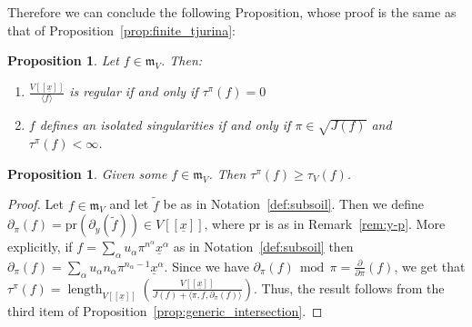 \documentclass{article}
\newtheorem{proposition}[theorem]{Proposition}
\DeclareMathOperator{\length}{length}
\newcommand{\maxV}{\mathfrak{m}_V}
\newcommand{\pder}{\frac{\partial}{\partial \pi}}
\numberwithin{theorem}{section}
\renewcommand{\mod}{\,\operatorname{mod}\,}
\begin{document}
Therefore we can conclude the following Proposition, whose proof is the same as that of Proposition~\ref{prop:finite_tjurina}:

\begin{proposition}\label{prop:ramified_iso_sing}
    Let $f \in \maxV$. Then:
    \begin{enumerate}
        \item $\frac{V[[\underline{x}]]}{ \langle f \rangle}$ is regular if and only if $\tau^\pi(f)=0$
        \item $f$ defines an isolated singularities if and only if $\pi \in \sqrt{J\left(f\right)}$ and  $\tau^\pi\left(f\right) < \infty$.
    \end{enumerate}
\end{proposition}


\begin{proposition}\label{prop:inequality_tau_pi}
    Given some $f \in \maxV$. Then $\tau^\pi(f) \geq \tau_V(f)$.
\end{proposition}

\begin{proof}
    Let $f \in \maxV$ and let $\tilde{f}$ be as in Notation~\ref{def:subsoil}. Then we define $\partial_\pi(f)= \text{pr} (\partial_y(\tilde{f})) \in V[[\underline{x}]]$, where $\text{pr}$ is as in Remark~\ref{rem:y-p}. More explicitly, if $f=\sum_{\alpha} u_{\alpha} \pi^{n^{\alpha}} \underline{x}^{\alpha}$ as in Notation~\ref{def:subsoil} then $\partial_\pi(f)=\sum_{\alpha} u_{\alpha} n_{\alpha}\pi^{n_{\alpha}-1} \underline{x}^{\alpha}$. Since we have $\partial_\pi(f) \mod \pi =\pder(f)$, we get that $\tau^\pi(f)=\length_{V[[\underline{x}]]} \left( \frac{V[[\underline{x}]]}{J(f) + \langle \pi, f, \partial_\pi(f) \rangle} \right)$. Thus, the result follows from the third item of Proposition~\ref{prop:generic_intersection}. 
\end{proof}
\end{document}
